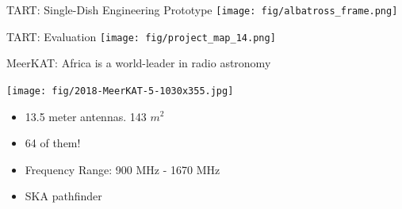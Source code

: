\documentclass[ignorenonframetext]{beamer}
\begin{document}
\begin{frame}
  \tableofcontents
\end{frame}


%

\begin{frame}{TART: Single-Dish Engineering Prototype}
   \texttt{[image: fig/albatross\_frame.png]}
\end{frame}

\begin{frame}{TART: Evaluation}
   \texttt{[image: fig/project\_map\_14.png]}
\end{frame}


% 


% 



\begin{frame}{MeerKAT: Africa is a world-leader in radio astronomy}
\begin{center}
  \texttt{[image: fig/2018-MeerKAT-5-1030x355.jpg]}
\end{center}
\begin{itemize}
 \item 13.5 meter antennas. 143 $m^2$
 \item 64 of them!
 \item Frequency Range: 900 MHz - 1670 MHz
 \item SKA pathfinder
\end{itemize}

\end{frame}
\end{document}
